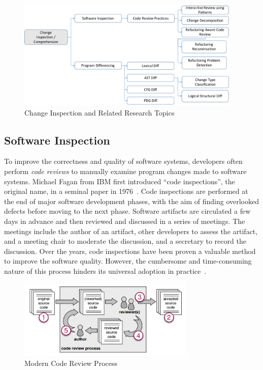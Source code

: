 \documentclass[runningheads,a4paper]{llncs}
\begin{document}
\begin{figure}[ht]
 \centering
 \includegraphics[width=0.95\textwidth]{images/ChangeInspection.pdf}
 \caption{Change Inspection and Related Research Topics} 
 \label{fig:changeinspection} 
\end{figure}

\subsection{Software Inspection} 
To improve the correctness and quality of software systems, developers often perform {\em code reviews} to manually examine program changes made to software systems. Michael Fagan from IBM first introduced ``code inspections'', the original name, in a seminal paper in 1976~\cite{Fagan1999:checklist}. Code inspections are performed at the end of major software development phases, with the aim of finding overlooked defects before moving to the next phase. Software artifacts are circulated a few days in advance and then reviewed and discussed in a series of meetings. The meetings include the author of an artifact, other developers to assess the artifact, and a meeting chair to moderate the discussion, and a secretary to record the discussion. Over the years, code inspections have been proven a valuable method to improve the software quality. However, the cumbersome and time-consuming nature of this process hinders its universal adoption in practice~\cite{johnson1998reengineering}. 

\begin{figure}[ht]
 \centering
 \includegraphics[width=0.75\textwidth]{images/review-process.png}
 \caption{Modern Code Review Process~\cite{beller2014modern}}
 \label{fig:review-process}
\end{figure}
\end{document}

